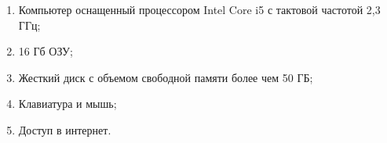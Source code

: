 \begin{enumerate}
        \item Компьютер оснащенный процессором Intel Core i5 с тактовой частотой 2,3 ГГц;
        \item 16 Гб ОЗУ;
        \item Жесткий диск с объемом свободной памяти более чем 50 ГБ;
        \item Клавиатура и мышь;
        \item Доступ в интернет.
    \end{enumerate}